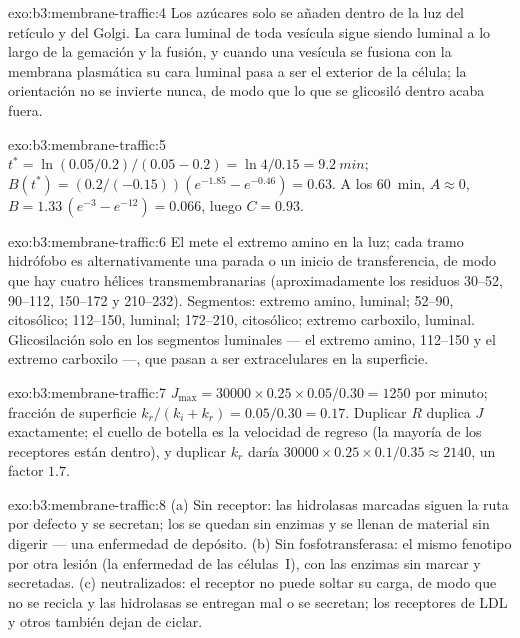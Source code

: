 \begin{solution}{exo:b3:membrane-traffic:4}
Los azúcares solo se añaden dentro de la luz del retículo y del Golgi. La
cara luminal de toda vesícula sigue siendo luminal a lo largo de la
gemación y la fusión, y cuando una vesícula se fusiona con la membrana
plasmática su cara luminal pasa a ser el exterior de la célula; la
orientación no se invierte nunca, de modo que lo que se glicosiló dentro
acaba fuera.
\end{solution}

\begin{solution}{exo:b3:membrane-traffic:5}
$t^{*} = \ln(0.05/0.2)/(0.05 - 0.2) = \ln 4/0.15 = \qty{9.2}{min}$;
$B(t^{*}) = (0.2/(-0.15))(e^{-1.85} - e^{-0.46}) = 0.63$. A los
\qty{60}{min}, $A \approx 0$, $B = 1.33\,(e^{-3} - e^{-12}) = 0.066$,
luego $C = 0.93$.
\end{solution}

\begin{solution}{exo:b3:membrane-traffic:6}
El  mete el extremo amino en la luz; cada tramo hidrófobo es
alternativamente una parada o un inicio de transferencia, de modo que hay
cuatro hélices transmembranarias (aproximadamente los residuos 30--52,
90--112, 150--172 y 210--232). Segmentos: extremo amino, luminal; 52--90,
citosólico; 112--150, luminal; 172--210, citosólico; extremo carboxilo,
luminal. Glicosilación solo en los segmentos luminales --- el extremo
amino, 112--150 y el extremo carboxilo ---, que pasan a ser
extracelulares en la superficie.
\end{solution}

\begin{solution}{exo:b3:membrane-traffic:7}
$J_{\max} = \num{30000}\times 0.25\times 0.05/0.30 = 1250$ por minuto;
fracción de superficie $k_{r}/(k_{i} + k_{r}) = 0.05/0.30 = 0.17$.
Duplicar $R$ duplica $J$ exactamente; el cuello de botella es la
velocidad de regreso (la mayoría de los receptores están dentro), y
duplicar $k_{r}$ daría $\num{30000}\times 0.25
\times 0.1/0.35 \approx 2140$, un factor $1.7$.
\end{solution}

\begin{solution}{exo:b3:membrane-traffic:8}
(a) Sin receptor: las hidrolasas marcadas siguen la ruta por defecto y se
secretan; los  se quedan sin enzimas y se llenan de material sin
digerir --- una enfermedad de depósito. (b) Sin fosfotransferasa: el
mismo fenotipo por otra lesión (la enfermedad de las células~I), con las
enzimas sin marcar y secretadas. (c)  neutralizados: el receptor
no puede soltar su carga, de modo que no se recicla y las hidrolasas se
entregan mal o se secretan; los receptores de LDL y otros también dejan
de ciclar.
\end{solution}

